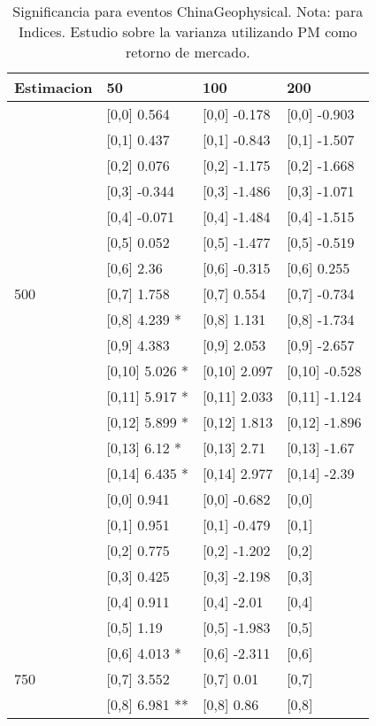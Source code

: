 \begin{table}

\caption{Significancia para eventos ChinaGeophysical. Nota: para Indices. Estudio sobre la varianza utilizando PM como retorno de mercado.}
\centering
\begin{tabular}[t]{llll}
\toprule
Estimacion & 50 & 100 & 200\\
\midrule
 & {}[0,0] 0.564 & {}[0,0] -0.178 & {}[0,0] -0.903\\
 & {}[0,1] 0.437 & {}[0,1] -0.843 & {}[0,1] -1.507\\
 & {}[0,2] 0.076 & {}[0,2] -1.175 & {}[0,2] -1.668\\
 & {}[0,3] -0.344 & {}[0,3] -1.486 & {}[0,3] -1.071\\
 & {}[0,4] -0.071 & {}[0,4] -1.484 & {}[0,4] -1.515\\
\addlinespace
 & {}[0,5] 0.052 & {}[0,5] -1.477 & {}[0,5] -0.519\\
 & {}[0,6] 2.36 & {}[0,6] -0.315 & {}[0,6] 0.255\\
500 & {}[0,7] 1.758 & {}[0,7] 0.554 & {}[0,7] -0.734\\
 & {}[0,8] 4.239 * & {}[0,8] 1.131 & {}[0,8] -1.734\\
 & {}[0,9] 4.383 & {}[0,9] 2.053 & {}[0,9] -2.657\\
\addlinespace
 & {}[0,10] 5.026 * & {}[0,10] 2.097 & {}[0,10] -0.528\\
 & {}[0,11] 5.917 * & {}[0,11] 2.033 & {}[0,11] -1.124\\
 & {}[0,12] 5.899 * & {}[0,12] 1.813 & {}[0,12] -1.896\\
 & {}[0,13] 6.12 * & {}[0,13] 2.71 & {}[0,13] -1.67\\
 & {}[0,14] 6.435 * & {}[0,14] 2.977 & {}[0,14] -2.39\\
\addlinespace
 & {}[0,0] 0.941 & {}[0,0] -0.682 & {}[0,0]\\
 & {}[0,1] 0.951 & {}[0,1] -0.479 & {}[0,1]\\
 & {}[0,2] 0.775 & {}[0,2] -1.202 & {}[0,2]\\
 & {}[0,3] 0.425 & {}[0,3] -2.198 & {}[0,3]\\
 & {}[0,4] 0.911 & {}[0,4] -2.01 & {}[0,4]\\
\addlinespace
 & {}[0,5] 1.19 & {}[0,5] -1.983 & {}[0,5]\\
 & {}[0,6] 4.013 * & {}[0,6] -2.311 & {}[0,6]\\
750 & {}[0,7] 3.552 & {}[0,7] 0.01 & {}[0,7]\\
 & {}[0,8] 6.981 ** & {}[0,8] 0.86 & {}[0,8]\\

\end{tabular}
\end{table}
